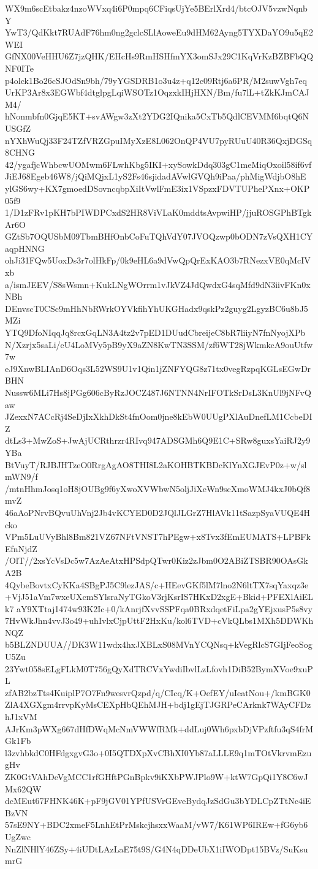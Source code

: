 WX9m6scEtbakz4nzoWVxq4i6P0mpq6CFiqsUjYe5BErlXrd4/btcOJV5vzwNqnbY
YwT3/QdKkt7RUAdF76hm0ng2gclcSLlAoweEu9dHM62Ayng5TYXDaYO9u5qE2WEI
GfNX00VeHHU6Z7jzQHK/EHcHs9RmHSHfmYX3omSJx29C1KqVrKzBZBFbQQNF0ITe
p4olck1Bo26cSJOdSn9bh/79yYGSDRB1o3u4z+q12c09Rtj6a6PR/M2suwVgh7eq
UrKP3Ar8x3EGWbf4dtglpgLqiWSOTz1OqzxkIHjHXN/Bm/fu7lL+tZkKJmCAJM4/
hNonmbfn0GjqE5KT+svAWgw3zXt2YDG2IQnika5CxTb5QdlCEVMM6bqtQ6NUSGfZ
nYXhWuQj33F24TZfVRZGpuIMyXzE8L062OnQP4VU7pyRUuU40R36QxjDGSq8CHNG
42/ygafjcWhbcwUOMwm6FLwhKbg5IKI+xySowkDdq303gC1meMiqOxoil58if6vf
JiEJ68Egeb46W8/jQiMQjxL1yS2Fs46sjidadAVwlGVQh9iPaa/phMigWdjbO8hE
ylGS6wy+KX7gmoedDSovncqbpXiItVwlFmE3ix1VSpzxFDVTUPhePXnx+OKP05f9
1/D1zFRv1pKH7bPIWDPCxdS2HR8ViVLaK0mddtsAvpwiHP/jjuROSGPhBTgkAr6O
GZtSb7OQUSbM09TbmBHfOnbCoFuTQhVdY07JVOQzwp0bODN7zVsQXH1CYaqpHNNG
ohJi31FQw5UoxDs3r7olHkFp/0k9eHL6a9dVwQpQrExKAO3b7RNezxVE0qMcIVxb
a/ismJEEV/S8sWsmn+KukLNgWOrrm1vJkVZ4JdQwdxG4sqMfd9dN3iivFKn0xNBh
DEnvscT0CSc9mHhNbRWrkOYVkfihYhUKGHadx9qskPz2guyg2LgyzBC6u8bJ5MZi
YTQ9DfoNIqqJq8rcxGqLN3A4tz2v7pED1DUudCbreijeC8bR7liiyN7fnNyojXPb
N/Xzrjx5saLi/eU4LoMVy5pB9yX9aZN8KwTN3SSM/zf6WT28jWkmkcA9ouUtfw7w
eJ9XnwBLIAnD6Oqs3L52WS9U1v1Qin1jZNFYQG8z71tx0vegRzpqKGLsEGwDrBHN
Nussw6MLi7Hs8jPGg606cByRzJOCZ487J6NTNN4NrIFOTkSrDsL3KnUl9jNFvQaw
JZexxN7ACcRj4SeDjIxXkhDkSt4fnOom0jne8kEbW0UUgPXlAuDnefLM1CcbeDIZ
dtLs3+MwZoS+JwAjUCRthrzr4RIvq947ADSGMh6Q9E1C+SRw8guxsYaiRJ2y9YBa
BtVuyT/RJBJHTzeO0RrgAgAO8THI8L2aKOHBTKBDcKlYnXGJEvP0z+w/slmWN9/f
/mtnHhmJosq1oH8jOUBg9f6yXwoXVWbwN5oljJiXeWn9scXmoWMJ4kxJ0bQf8mvZ
46aAoPNrvBQvuUhVnj2Jb4vKCYED0D2JQlJLGrZ7HlAVk11tSazpSyaVUQE4Hcko
VPm5LuUVyBhl8Bm821VZ67NFtVNST7hPEgw+x8Tvx3fEmEUMATS+LPBFkEfnNjdZ
/OlT//2xsYcVsDc5w7AzAeAtxHPSdpQTwr0Kiz2zJbm0O2ABiZTSBR90OAsGkA2B
4QybeBovtxCyKKa4SBgPJ5C9lezJAS/c+HEevGKf5lM7lno2N6ltTX7sqYaxqz3e
+VjJ51aVm7wxeUXcmSYlsraNyTGkoV3rjKsrIS7HKxD2xgE+Bkid+PFEXlAiELk7
aY9XTtaj1474w93K2Ic+0/kAnrjfXvvSSPFqa0BRxdqetFiLpa2gYEjxusP5s8vy
7HvWkJhn4vvJ3o49+uhIvlxCjpUttF2HxKu/kol6TVD+cVkQLbs1MXh5DDWKhNQZ
b5BLZNDUUA//DK3W11wdx4hxJXBLxS08MVnYCQNsq+kVegRlcS7GIjFeoSogU5Zu
23Ywt058sELgFLkM0T756gQyXdTRCVxYwdiIbvlLzLfovh1DiB52BymXVoe9xuPL
zfAB2bzTts4KuiplP7O7Fn9wesvrQzpd/q/CIcq/K+OefEY/uIeatNou+/kmBGK0
ZlA4XGXgm4rrvpKyMsCEXpHbQEhMJH+bdj1gEjTJGRPeCArknk7WAyCFDzhJ1xVM
AJrKm3pWXg667dHfDWqMcNmVWWfRMk+ddLuj0Wh6pxbDjVPzftfu3qS4frMGk1Fb
l3zvhbkdC0HFdgxgvG3o+0I5QTDXpXvCBhXI0Yb87aLLLE9q1mTOtVkrvmEzugHv
ZK0GtVAhDeVgMCC1rfGHftPGnBpkv9iKXbPWJPlo9W+ktW7GpQi1Y8C6wJMx62QW
dcMEut67FHNK46K+pF9jGV01YPfUSVrGEveBydqJzSdGu3bYDLCpZTtNc4iEBzVN
57sE9NY+BDC2xmeF5LnhEtPrMskcjhsxxWaaM/vW7/K61WP6IREw+fG6yb6UgZwc
NnZlNHlY46ZSy+4iUDtLAzLaE75t9S/G4N4qDDeUbX1iIWODpt15BVz/SuKsumrG
